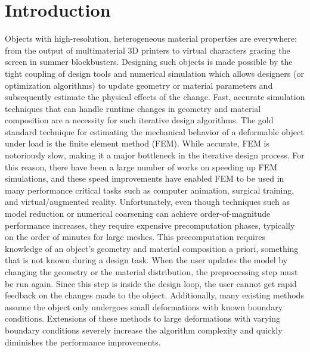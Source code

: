\section{Introduction}
Objects with high-resolution, heterogeneous material properties are everywhere:
from the output of multimaterial 3D printers 
to virtual characters gracing the screen in summer blockbusters.
Designing such objects is made possible by the tight coupling of design
tools and numerical simulation which allows designers 
(or optimization algorithms) to update geometry or material parameters 
and subsequently estimate the physical effects of the change.
Fast, accurate simulation techniques that can handle runtime changes 
in geometry and material composition are a necessity for such iterative design algorithms.
The gold standard technique for estimating the mechanical behavior
of a deformable object under load is the finite element method (FEM).
While accurate, FEM is notoriously slow,
making it a major bottleneck in the iterative design process.
For this reason, there have been a large number of works on speeding up FEM simulations,
and these speed improvements have enabled FEM to be used in many performance critical tasks
such as computer animation, surgical training, and virtual/augmented reality.
Unfortunately, even though techniques such as model reduction or numerical coarsening 
can achieve order-of-magnitude performance increases,
they require expensive precomputation phases, typically on the order of minutes
for large meshes. This precomputation requires knowledge of an object’s 
geometry and material composition a priori,
something that is not known during a design task.
When the user updates the model by changing the geometry or the material distribution,
the preprocessing step must be run again.
Since this step is inside the design loop,
the user cannot get rapid feedback on the changes made to the object.
Additionally, many existing methods assume the object only undergoes small deformations
with known boundary conditions.
Extensions of these methods to large deformations with varying boundary conditions
severely increase the algorithm complexity and quickly diminishes the performance improvements.
